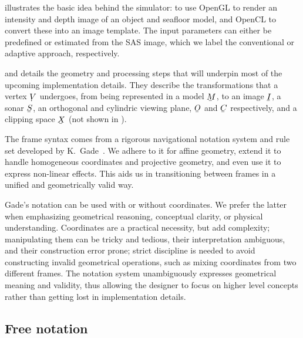  illustrates the basic idea behind the simulator: to use OpenGL to render an intensity and depth image of an object and seafloor model, and OpenCL to convert these into an image template. The input parameters can either be predefined or estimated from the SAS image, which we label the conventional or adaptive approach, respectively.

 and  details the geometry and processing steps that will underpin most of the upcoming implementation details. They describe the transformations that a vertex $\udot{V}$ undergoes, from being represented in a model $\ubar{M}$, to an image $\ubar{I}$, a sonar $\ubar{S}$, an orthogonal and cylindric viewing plane, $\ubar{O}$ and $\ubar{C}$ respectively, and a clipping space $\ubar{X}$ (not shown in ).

The frame syntax comes from a rigorous navigational notation system and rule set developed by K.~Gade~\cite{Gade2018}. We adhere to it for affine geometry, extend it to handle homogeneous coordinates and projective geometry, and even use it to express non-linear effects. This aids us in transitioning between frames in a unified and geometrically valid way.




Gade's notation can be used with or without coordinates. We prefer the latter when emphasizing geometrical reasoning, conceptual clarity, or physical understanding. Coordinates are a practical necessity, but add complexity; manipulating them can be tricky and tedious, their interpretation ambiguous, and their construction error prone; strict discipline is needed to avoid constructing invalid geometrical operations, such as mixing coordinates from two different frames. The notation system unambiguously expresses geometrical meaning and validity, thus allowing the designer to focus on higher level concepts rather than getting lost in implementation details. 

\subsection{Free notation}\label{IV_sec:general_notation}




